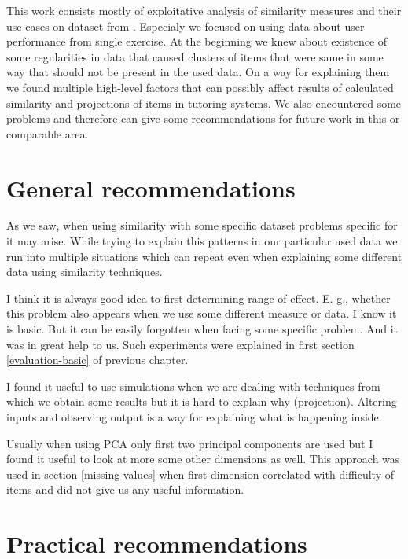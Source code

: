 \documentclass[
  digital, %
  table,   %
  nolof,     %
  nolot,     %
  nocover,
  color
]{fithesis3}
\begin{document}
This work consists mostly of exploitative analysis of similarity measures and their use cases on dataset from \umimeCesky{}. Especialy we focused on using data about user performance from single exercise. At the beginning we knew about existence of some regularities in data that caused clusters of items that were same in some way that should not be present in the used data. On a way for explaining them we found multiple high-level factors that can possibly affect results of calculated similarity and projections of items in tutoring systems. We also encountered some problems and therefore can give some recommendations for future work in this or comparable area.


\section{General recommendations}\label{general-recommendations}

As we saw, when using similarity with some specific dataset problems specific for it may arise. While trying to explain this patterns in our particular used data we run into multiple situations which can repeat even when explaining some different data using similarity techniques.


I think it is always good idea to first determining range of effect. E. g., whether this problem also appears when we use some different measure or data. I know it is basic. But it can be easily forgotten when facing some specific problem. And it was in great help to us. Such experiments were explained in first section \ref{evaluation-basic} of previous chapter.


I found it useful to use simulations when we are dealing with techniques from which we obtain some results but it is hard to explain why (projection). Altering inputs and observing output is a way for explaining what is happening inside.


Usually when using PCA only first two principal components are used but I found it useful to look at more some other dimensions as well. This approach was used in section \ref{missing-values} when first dimension correlated with difficulty of items and did not give us any useful information.

\section{Practical recommendations}\label{practical-recommendations}
\end{document}
